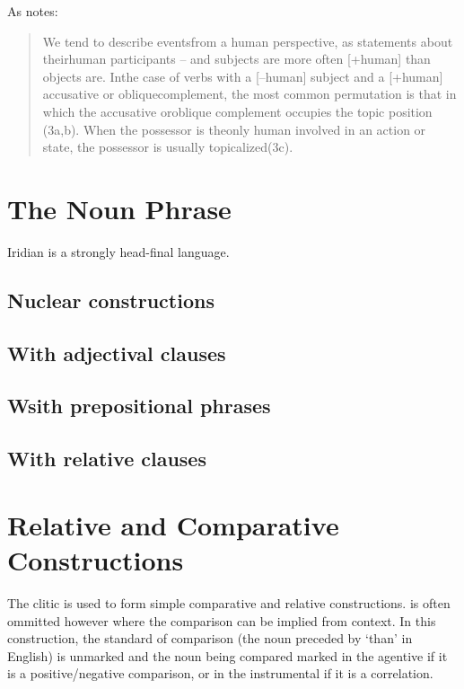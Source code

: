 \xe

As \textcite[9]{kiss2004} notes:

\begin{quote}
  We tend to describe eventsfrom a human perspective, as statements about theirhuman participants – and subjects are more often [+human] than objects are. Inthe case of verbs with a [–human] subject and a [+human] accusative or obliquecomplement,  the  most  common  permutation  is  that  in  which  the  accusative  oroblique complement occupies the topic position (3a,b). When the possessor is theonly human involved in an action or state, the possessor is usually topicalized(3c).
\end{quote}

\section{The Noun Phrase}

Iridian is a strongly head-final language.

\subsection{Nuclear constructions}
\subsection{With adjectival clauses}
\subsection{Wsith prepositional phrases}
\subsection{With relative clauses}

\section{Relative and Comparative Constructions}\label{relativecomparative}

The clitic  is used to form simple comparative and relative constructions.  is often ommitted however where the comparison can be implied from context. In this construction, the standard of comparison (the noun preceded by `than' in English) is unmarked and the noun being compared marked in the agentive if it is a positive/negative comparison, or in the instrumental if it is a correlation.


